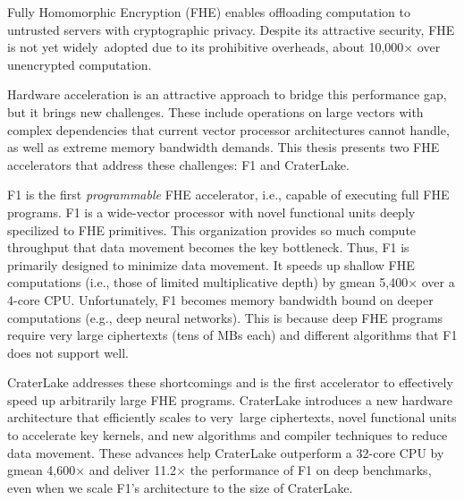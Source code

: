 Fully Homomorphic Encryption (FHE) enables offloading computation to untrusted
servers with cryptographic privacy. Despite its attractive security, FHE is not
yet widely~adopted due to its prohibitive overheads, about 10,000$\times$ over
unencrypted computation.

Hardware acceleration is an attractive approach to bridge this performance gap,
but it brings new challenges. These include operations on large vectors with
complex dependencies that current vector processor architectures cannot handle,
as well as extreme memory bandwidth demands. This thesis presents two FHE
accelerators that address these challenges: F1 and CraterLake.

F1 is the first \emph{programmable} FHE accelerator, i.e., capable of executing
full FHE programs. F1 is a wide-vector processor with novel functional units
deeply specilized to FHE primitives. This organization provides so much compute
throughput that data movement becomes the key bottleneck. Thus, F1 is primarily
designed to minimize data movement. It speeds up shallow FHE computations
(i.e., those of limited multiplicative depth) by gmean 5,400$\times$ over a
4-core CPU. Unfortunately, F1 becomes memory bandwidth bound on deeper
computations (e.g., deep neural networks). This is because deep FHE programs
require very large ciphertexts (tens of MBs each) and different algorithms that
F1 does not support well.

CraterLake addresses these shortcomings and is the first accelerator to
effectively speed up arbitrarily large FHE programs.  CraterLake introduces a
new hardware architecture that efficiently scales to very~large ciphertexts,
novel functional units to accelerate key kernels, and new algorithms and
compiler techniques to reduce data movement. These advances help CraterLake
outperform a 32-core CPU by gmean 4,600$\times$ and deliver 11.2$\times$ the
performance of F1 on deep benchmarks, even when we scale F1's architecture to
the size of CraterLake.


